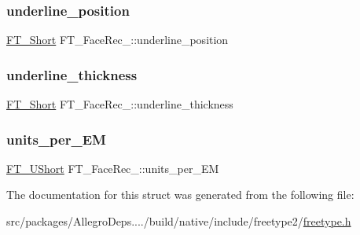 \mbox{\label{struct_f_t___face_rec___ac4f899e32a37a89794d6c160a26937e1}} 
\subsubsection{\texorpdfstring{underline\+\_\+position}{underline\_position}}
{\footnotesize\ttfamily \hyperlink{fttypes_8h_aa7279be89046a2563cd3d4d6651fbdcf}{F\+T\+\_\+\+Short} F\+T\+\_\+\+Face\+Rec\+\_\+\+::underline\+\_\+position}

\mbox{\label{struct_f_t___face_rec___a61adda036bab17c419c358a31693e680}} 
\subsubsection{\texorpdfstring{underline\+\_\+thickness}{underline\_thickness}}
{\footnotesize\ttfamily \hyperlink{fttypes_8h_aa7279be89046a2563cd3d4d6651fbdcf}{F\+T\+\_\+\+Short} F\+T\+\_\+\+Face\+Rec\+\_\+\+::underline\+\_\+thickness}

\mbox{\label{struct_f_t___face_rec___a8fde3c2d9b5fab717d8398b4196dd041}} 
\subsubsection{\texorpdfstring{units\+\_\+per\+\_\+\+EM}{units\_per\_EM}}
{\footnotesize\ttfamily \hyperlink{fttypes_8h_a937f6c17cf5ffd09086d8610c37b9f58}{F\+T\+\_\+\+U\+Short} F\+T\+\_\+\+Face\+Rec\+\_\+\+::units\+\_\+per\+\_\+\+EM}



The documentation for this struct was generated from the following file\+:\begin{DoxyCompactItemize}
\item 
src/packages/\+Allegro\+Deps..../build/native/include/freetype2/\hyperlink{freetype_8h}{freetype.\+h}\end{DoxyCompactItemize}
